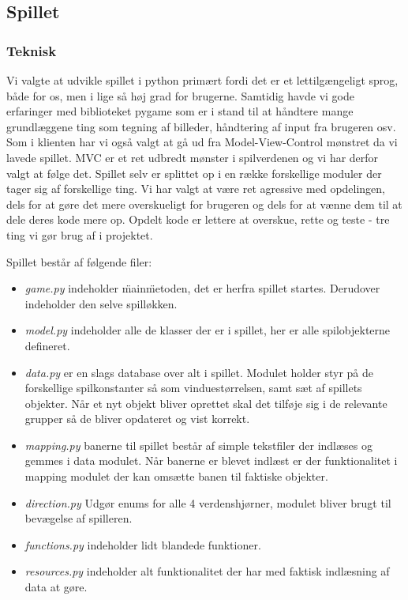 \documentclass[10pt,a4paper,danish]{article}
\begin{document}
\subsection{Spillet}
\subsubsection{Teknisk}
Vi valgte at udvikle spillet i python primært fordi det er et lettilgængeligt sprog, både for os, men i lige så høj grad for brugerne. Samtidig havde vi gode erfaringer med biblioteket pygame som er i stand til at håndtere mange grundlæggene ting som tegning af billeder, håndtering af input fra brugeren osv.
\\

Som i klienten har vi også valgt at gå ud fra Model-View-Control mønstret da vi lavede spillet. MVC er et ret udbredt mønster i spilverdenen og vi har derfor valgt at følge det. 
Spillet selv er splittet op i en række forskellige moduler der tager sig af forskellige ting. Vi har valgt at være ret agressive med opdelingen, dels for at gøre det mere overskueligt for brugeren og dels for at vænne dem til at dele deres kode mere op. Opdelt kode er lettere at overskue, rette og teste - tre ting vi gør brug af i projektet.

Spillet består af følgende filer:
\begin{itemize}
\item \textit{game.py} indeholder \"main\" metoden, det er herfra spillet startes. Derudover indeholder den selve spilløkken.
\item \textit{model.py} indeholder alle de klasser der er i spillet, her er alle spilobjekterne defineret.
\item \textit{data.py} er en slags database over alt i spillet. Modulet holder styr på de forskellige spilkonstanter så som vinduestørrelsen, samt sæt af spillets objekter. Når et nyt objekt bliver oprettet skal det tilføje sig i de relevante grupper så de bliver opdateret og vist korrekt.
\item \textit{mapping.py} banerne til spillet består af simple tekstfiler der indlæses og gemmes i data modulet. Når banerne er blevet indlæst er der funktionalitet i mapping modulet der kan omsætte banen til faktiske objekter.
\item \textit{direction.py} Udgør enums for alle 4 verdenshjørner, modulet bliver brugt til bevægelse af spilleren.
\item \textit{functions.py} indeholder lidt blandede funktioner.
\item \textit{resources.py} indeholder alt funktionalitet der har med faktisk indlæsning af data at gøre.
\end{itemize}
\end{document}
